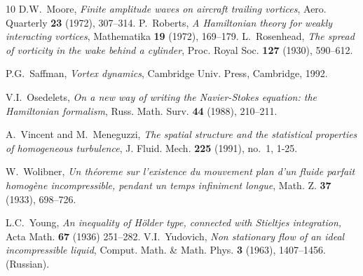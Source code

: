 \documentclass[a4paper,11pt]{article}
\numberwithin{equation}{section}
\begin{document}
\begin{thebibliography}{10}
D.W.~Moore, \emph{Finite amplitude waves on aircraft trailing
  vortices}, Aero. Quarterly \textbf{23} (1972), 307--314. 
%
%  
%
P.~Roberts, \emph{A Hamiltonian theory for weakly interacting
  vortices}, Mathematika \textbf{19} (1972), 169--179. 
L.~Rosenhead, \emph{The spread of vorticity in the wake behind a
  cylinder}, Proc. Royal Soc. \textbf{127} (1930), 590--612. 

P.G.~Saffman, \emph{Vortex dynamics}, Cambridge Univ. Press, 
Cambridge, 1992.
%
%

%
V.I.~Osedelets, \emph{On a new way of writing the Navier-Stokes
  equation: the Hamiltonian formalism}, Russ. Math. Surv. \textbf{44}
(1988), 210--211. 

A.~Vincent and M.~Meneguzzi, \emph{The spatial structure and the
  statistical properties of homogeneous turbulence},
J. Fluid. Mech. {\bf 225} (1991), no.~1, 1-25.  

W.~Wolibner, \emph{Un th\'eoreme sur l'existence du mouvement plan
  d'un \mbox{fluide} parfait  ho\-mog\`ene incompressible, pendant un
  temps infiniment longue}, {Math. Z.} \textbf{37} (1933), 698--726. 

L.C.~Young, \emph{An inequality of H\"older type, connected with
  Stieltjes integration,}  Acta Math. \textbf{67} (1936) 251--282.
V.I.~Yudovich, \emph{Non stationary flow of an ideal incompressible
  liquid}, {Comput. Math. \& Math. Phys.} \textbf{3} (1963),
1407--1456. (Russian).  
\end{thebibliography}
\end{document}
